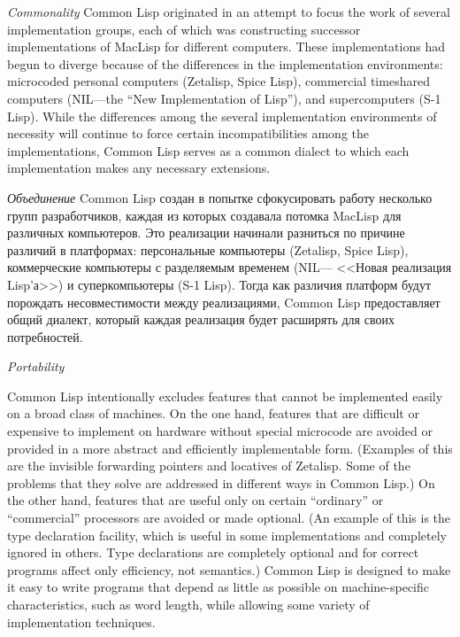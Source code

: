 \begin{flushdesc}
\item[\textit{Commonality}]
Common Lisp originated in an attempt to focus the
work of several implementation groups, each of which was constructing successor
implementations of MacLisp for different computers.  These
implementations had begun to diverge because of the differences in the
implementation environments: microcoded personal computers (Zetalisp,
Spice Lisp), commercial timeshared computers (NIL---the ``New Implementation of
Lisp''), and supercomputers (S-1 Lisp).  While the differences among the several
implementation environments of necessity will continue to force
certain incompatibilities among the
implementations, Common Lisp serves as a common dialect to
which each implementation makes any necessary extensions.

\item[\textit{Объединение}]
Common Lisp создан в попытке сфокусировать работу несколько групп
разработчиков, каждая из которых создавала потомка MacLisp для
различных компьютеров. Это реализации начинали разниться по
причине различий в платформах: персональные компьютеры (Zetalisp,
Spice Lisp), коммерческие компьютеры с разделяемым временем
(NIL--- <<Новая реализация Lisp'а>>) и суперкомпьютеры (S-1
Lisp). Тогда как различия платформ будут порождать несовместимости
между реализациями, Common Lisp предоставляет общий диалект,
который каждая реализация будет расширять для своих потребностей.

\item[\textit{Portability}]

\begingroup{}
Common Lisp intentionally excludes features
that cannot be implemented easily on a broad class of machines.
On the one hand, features that are difficult or expensive
to implement on hardware without special microcode are avoided
or provided in a more abstract and efficiently implementable form.
(Examples of this are the invisible forwarding pointers
and locatives of Zetalisp.  Some of the problems that they solve
are addressed in different ways in Common Lisp.)
On the other hand, features that are useful only on certain ``ordinary''
or ``commercial'' processors are avoided or made optional.  (An example of
this is the type declaration facility, which is useful in some
implementations and completely ignored in others.  Type declarations are
completely optional and for correct programs
affect only efficiency, not semantics.)
Common Lisp is designed to make it easy to write programs
that depend as little as possible on machine-specific
characteristics, such as word length, while allowing some variety of
implementation \hbox{techniques}.
\par\endgroup


\end{flushdesc}
